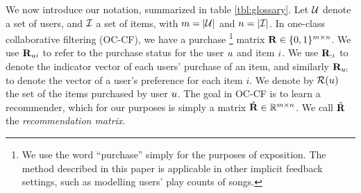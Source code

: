 
We now introduce our notation, summarized in table \ref{tbl:glossary}. %
Let $\mathcal{U}$ denote a set of users, and $\mathcal{I}$ a set of items,
with $m = | \mathcal{U} |$ and $n = | \mathcal{I} |$.
In one-class collaborative filtering (OC-CF), we have a purchase 
\footnote{We use the word ``purchase'' simply for the purposes of exposition. The method described in this paper is applicable in other implicit feedback settings, such as modelling users' play counts of songs.} 
matrix $\mathbf{R} \in \{ 0, 1 \}^{m \times n}$. %
We use $\mathbf{R}_{ui}$ to refer to the purchase status for the user $u$ and item $i$.
We use $\mathbf{R}_{:i}$ to denote the indicator vector of each users' purchase of an item, and similarly $\mathbf{R}_{u:}$ to denote the vector of a user's preference for each item $i$.
We denote by  $\mathcal{R}(u)$ the set of the items purchased by user $u$. The goal in OC-CF is to learn a recommender, which for our purposes is simply a matrix $\hat{\mathbf{R}} \in \mathbb{R}^{m \times n}$. %
We call $\hat{\mathbf{R}}$ the \emph{recommendation matrix}.

\begin{table}[t]
	\centering
	\caption{Commonly used symbols.}
	\label{tbl:glossary}
\end{table}


